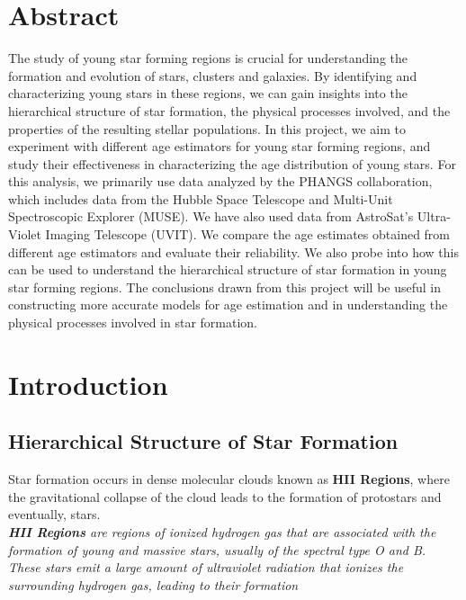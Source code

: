 \documentclass[12pt]{report}
\begin{document}
\newpage
\chapter*{Abstract}

The study of young star forming regions is crucial for understanding the formation and evolution of stars, clusters and galaxies. By identifying and characterizing young stars in these regions, we can gain insights into the hierarchical structure of star formation, the physical processes involved, and the properties of the resulting stellar populations. In this project, we aim to experiment with different age estimators for young star forming regions, and study their effectiveness in characterizing the age distribution of young stars. For this analysis, we primarily use data analyzed by the PHANGS collaboration, which includes data from the Hubble Space Telescope and Multi-Unit Spectroscopic Explorer (MUSE). We have also used data from AstroSat's Ultra-Violet Imaging Telescope (UVIT). We compare the age estimates obtained from different age estimators and evaluate their reliability. We also probe into how this can be used to understand the hierarchical structure of star formation in young star forming regions. The conclusions drawn from this project will be useful in constructing more accurate models for age estimation and in understanding the physical processes involved in star formation.

\tableofcontents
\newpage

\chapter{Introduction}
\section{Hierarchical Structure of Star Formation}

Star formation occurs in dense molecular clouds known as \textbf{HII Regions}, where the gravitational collapse of the cloud leads to the formation of protostars and eventually, stars.\\ 

\textit{\textbf{HII Regions} are regions of ionized hydrogen gas that are associated with the formation of young and massive stars, usually of the spectral type O and B. These stars emit a large amount of ultraviolet radiation that ionizes the surrounding hydrogen gas, leading to their formation}\\
\end{document}
